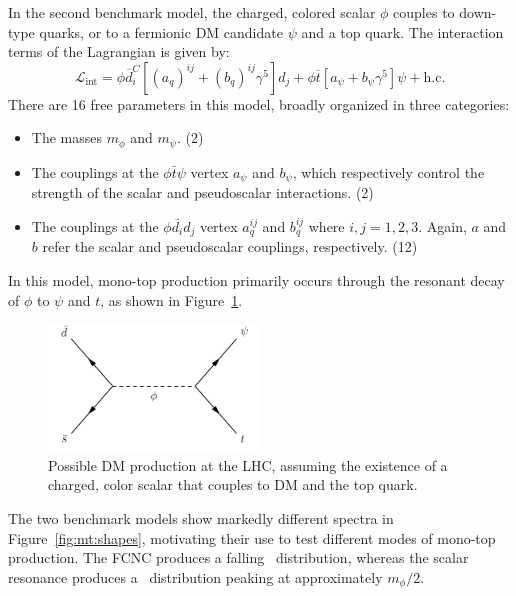 In the second benchmark model, the charged, colored scalar $\phi$ couples to down-type quarks, or to a fermionic DM candidate $\psi$ and a top quark.
The interaction terms of the Lagrangian is given by:
\begin{equation}
    \mathcal{L}_\text{int} = \phi\overline{{d}}_i^C[(a_{q})^{ij}+(b_{q})^{ij}\gamma^5]{d}_j+\phi\overline{{t}}[a_{\psi}+b_{\psi}\gamma^5]\psi+\text{h.c.}
\end{equation}
There are 16 free parameters in this model, broadly organized in three categories:
\begin{itemize}
    \item The masses $m_\phi$ and $m_\psi$. (2)
    \item The couplings at the $\phi \bar{t} \psi$ vertex $a_\psi$ and $b_\psi$, which respectively control the strength of the scalar and pseudoscalar interactions. (2)
    \item The couplings at the $\phi \bar{d_i} d_j$ vertex $a_q^{ij}$ and $b_q^{ij}$ where $i,j=1,2,3$. Again, $a$ and $b$ refer the scalar and pseudoscalar couplings, respectively. (12)
\end{itemize}
In this model, mono-top production primarily occurs through the resonant decay of $\phi$ to $\psi$ and $t$, as shown in Figure~\ref{fig:mt:resdiag}.

\begin{figure}[]
    \begin{center}
        \includegraphics[width=0.5\textwidth]{figures/monotop/diagrams/resonant.pdf}
        \caption{Possible DM production at the LHC, assuming the existence of a charged, color scalar that couples to DM and the top quark.}
        \label{fig:mt:resdiag}
    \end{center}
\end{figure}

The two benchmark models show markedly different spectra in Figure~\ref{fig:mt:shapes}, motivating their use to test different modes of mono-top production.
The FCNC produces a falling \ptmiss~distribution, whereas the scalar resonance produces a \ptmiss~distribution peaking at approximately $m_\phi / 2$.

